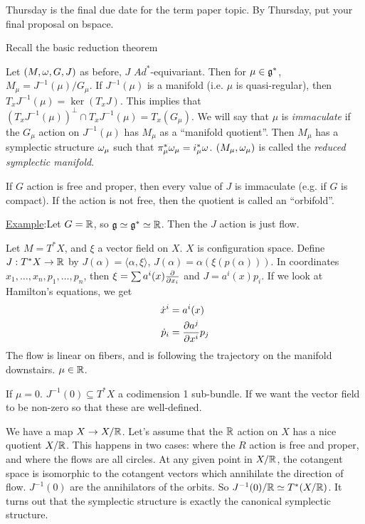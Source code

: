  \setcounter{lecture}{15}

 Thursday is the final due date for the term paper topic.  By Thursday, put your final
 proposal on bspace.

 Recall the basic reduction theorem
 \begin{theorem}
   Let $(M,\omega,G,J)$ as before, $J$ $Ad^*$-equivariant.  Then for $\mu\in \mathfrak{g}^*$,
   $M_\mu=J^{-1}(\mu)/G_\mu$.  If $J^{-1}(\mu)$ is a manifold (i.e. $\mu$ is
   quasi-regular), then $T_xJ^{-1}(\mu) = \ker (T_x J)$.  This implies that
   $(T_xJ^{-1}(\mu))^\perp\cap T_x J^{-1}(\mu) = T_x (G_\mu)$.  We will say that $\mu$
 is \emph{immaculate} if the $G_\mu$ action on $J^{-1}(\mu)$ has $M_\mu$ as a
 ``manifold quotient''.  Then $M_\mu$ has a symplectic structure $\omega_\mu$ such that
 $\pi_\mu^* \omega_\mu = i_\mu^* \omega$.  $(M_\mu,\omega_\mu)$ is called the \emph{reduced
 symplectic manifold}.
 \end{theorem}

 If $G$ action is free and proper, then every value of $J$ is immaculate (e.g. if $G$
 is compact).  If the action is not free, then the quotient is called an ``orbifold''.

 \underline{Example}:Let $G=\mathbb{R}$, so $\mathfrak{g}\simeq\mathfrak{g}^*\simeq\mathbb{R}$.  Then the $J$ action
 is just flow.

 Let $M=T^*X$, and $\xi$ a vector field on $X$. $X$ is configuration space.  Define
 $J:T^*X\to \mathbb{R}$ by $J(\alpha) = \langle \alpha, \xi\rangle$, $J(\alpha) =
 \alpha(\xi(p(\alpha)))$.  In coordinates $x_1,\dots, x_n, p_1,\dots, p_n$, then $\xi
 = \sum a^i(x) \frac{\partial }{\partial x_i}$ and $J=a^i(x)p_i$.  If we look at Hamilton's equations,
 we get
 \begin{align*}
   \dot{x}^i &= a^i(x)\\
   \dot{p}_i &= \frac{\partial a^j}{\partial x^i}p_j
 \end{align*}
 The flow is linear on fibers, and is following the trajectory on the manifold
 downstairs.  $\mu\in \mathbb{R}$.

  If $\mu=0$. $J^{-1}(0)\subseteq T^*X$ a codimension 1 sub-bundle.  If we
  want the vector field to be non-zero so that these are well-defined.

  We have a map $X\to X/\mathbb{R}$.  Let's assume that the $\mathbb{R}$ action on $X$ has a nice
  quotient $X/\mathbb{R}$.  This happens in two cases: where the $R$ action is free and
  proper, and where the flows are all circles.  At any given point in $X/\mathbb{R}$, the
  cotangent space is isomorphic to the cotangent vectors which annihilate the
  direction of flow.  $J^{-1}(0)$ are the annihilators of the orbits.  So
  $J^{-1}(0)/\mathbb{R}\simeq T^*(X/\mathbb{R})$.  It turns out that the symplectic structure is
  exactly the canonical symplectic structure.

